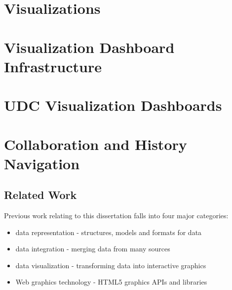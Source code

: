 \documentclass[12pt]{report}
\begin{document}
\begin{doublespace}
\chapter{Visualizations}
\chapter{Visualization Dashboard Infrastructure}
\chapter{UDC Visualization Dashboards}
\chapter{Collaboration and History Navigation}

\section{Related Work}
Previous work relating to this dissertation falls into four major categories:
\begin{itemize}
\item data representation - structures, models and formats for data
\item data integration - merging data from many sources
\item data visualization - transforming data into interactive graphics
\item Web graphics technology - HTML5 graphics APIs and libraries
\end{itemize}

\end{doublespace}
\end{document}
